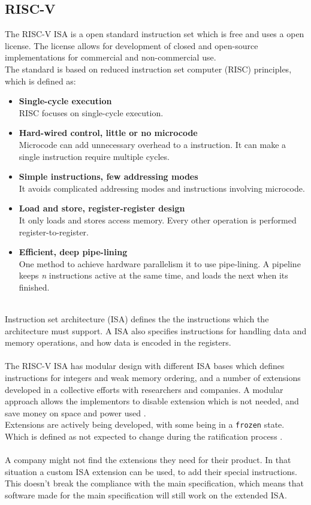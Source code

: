 \subsection{RISC-V}
The RISC-V ISA is a open standard instruction set which is free and uses a open license. The license allows for development of closed and open-source implementations for commercial and non-commercial use.\\
The standard is based on reduced instruction set computer (RISC) principles, which is defined as:
\begin{itemize}
    \item \textbf{Single-cycle execution}\\RISC focuses on single-cycle execution.
    \item \textbf{Hard-wired control, little or no microcode}\\Microcode can add unnecessary overhead to a instruction. It can make a single instruction require multiple cycles.
    \item \textbf{Simple instructions, few addressing modes}\\It avoids complicated addressing modes and instructions involving microcode. 
    \item \textbf{Load and store, register-register design}\\It only loads and stores access memory. Every other operation is performed register-to-register.
    \item \textbf{Efficient, deep pipe-lining}\\One method to achieve hardware parallelism it to use pipe-lining. A pipeline keeps \textit{n} instructions active at the same time, and loads the next when its finished.
\end{itemize}
\\
Instruction set architecture (ISA) defines the the instructions which the architecture must support. A ISA also specifies instructions for handling data and memory operations, and how data is encoded in the registers.\\
\\
The RISC-V ISA has modular design with different ISA bases which defines instructions for integers and weak memory ordering, and a number of extensions developed in a collective efforts with researchers and companies.
A modular approach allows the implementors to disable extension which is not needed, and save money on space and power used \cite{extendrisc}. \\
Extensions are actively being developed, with some being in a \texttt{frozen} state. Which is defined as not expected to change during the ratification process \cite{riscmanual}.\\
\\
A company might not find the extensions they need for their product. In that situation a custom ISA extension can be used, to add their special instructions. 
This doesn't break the compliance with the main specification, which means that software made for the main specification will still work on the extended ISA.

